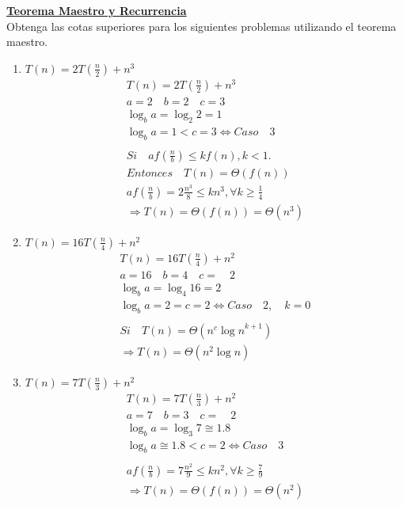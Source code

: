 \documentclass[dcc,uchile,sol]{fcfmcourse}
\newcommand{\ptitle}[1]{\underline{\textbf{#1}}}
\begin{document}
\begin{problems}
\problem \ptitle{Teorema Maestro y Recurrencia}\\
Obtenga las cotas superiores para los siguientes problemas utilizando el teorema maestro.
\begin{enumerate}
    \item $T(n)=2T(\frac{n}{2})+n^3$
    \begin{align*}
        T(n)=2T(\frac { n }{ 2 } )+{ n }^{ 3 }\\
        a=2\quad b=2\quad c=3 \\
        \log _{ b }{ a } =\log _{ 2 }{ 2 } =1 \\
        \log _{ b }{ a }=1<c=3\Leftrightarrow Caso\quad3 \\ \\
        Si\quad af(\frac{n}{b})\le kf(n), k<1.\\
        Entonces\quad T(n)=\Theta(f(n)) \\
        af(\frac{n}{b})=2\frac{n^3}{8} \le kn^3, \forall k\ge \frac{1}{4} \\
        \Rightarrow T(n)=\Theta(f(n))=\Theta(n^3)
    \end{align*}
    \item $T(n)=16T(\frac{n}{4})+n^2$
    \begin{align*}
        T(n)=16T(\frac { n }{ 4 } )+n^{ 2 }\\ a=16\quad b=4\quad c=\quad 2\\ \log _{ b }{ a } =\log _{ 4 }{ 16 } =2\\ \log _{ b }{ a } =2=c=2\Leftrightarrow Caso\quad 2,\quad k=0\\ \\ Si\quad T(n)=\Theta ({ n }^{ c }{ \log { n }  }^{ k+1 })\\ \Rightarrow T(n)=\Theta ({ n }^{ 2 }\log { n } )
    \end{align*}
    \item $T(n)=7T(\frac{n}{3})+n^2$
    \begin{align*}
        T(n)=7T(\frac { n }{ 3 } )+n^{ 2 }\\ a=7\quad b=3\quad c=\quad 2\\ \log _{ b }{ a } =\log _{ 3 }{ 7 } \cong 1.8\\ \log _{ b }{ a } \cong 1.8<c=2\Leftrightarrow Caso\quad 3\\ \\ af(\frac { n }{ b } )=7\frac { n^{ 2 } }{ 9 } \le kn^{ 2 },\forall k\ge \frac { 7 }{ 9 } \\ \Rightarrow T(n)=\Theta (f(n))=\Theta (n^{ 2 })
    \end{align*}

\end{enumerate}
\end{problems}
\end{document}
